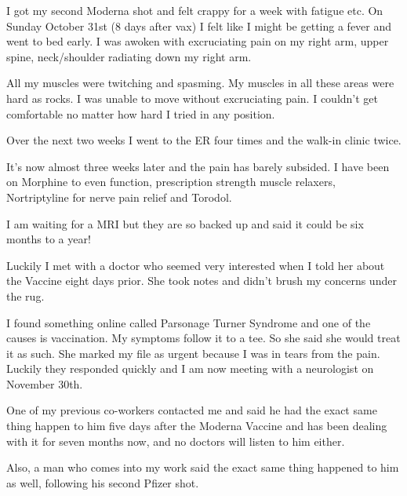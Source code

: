 I got my second Moderna shot and felt crappy for a week with fatigue etc. On
Sunday October 31st (8 days after vax) I felt like I might be getting a fever
and went to bed early. I was awoken with excruciating pain on my right arm,
upper spine, neck/shoulder radiating down my right arm.

All my muscles were twitching and spasming. My muscles in all these areas were
hard as rocks. I was unable to move without excruciating pain. I couldn’t get
comfortable no matter how hard I tried in any position.

Over the next two weeks I went to the ER four times and the walk-in clinic
twice.

It’s now almost three weeks later and the pain has barely subsided. I have been
on Morphine to even function, prescription strength muscle relaxers,
Nortriptyline for nerve pain relief and Torodol.

I am waiting for a MRI but they are so backed up and said it could be six months
to a year!

Luckily I met with a doctor who seemed very interested when I told her about the
Vaccine eight days prior. She took notes and didn’t brush my concerns under the
rug.

I found something online called Parsonage Turner Syndrome and one of the causes
is vaccination. My symptoms follow it to a tee. So she said she would treat it
as such. She marked my file as urgent because I was in tears from the
pain. Luckily they responded quickly and I am now meeting with a neurologist on
November 30th.

One of my previous co-workers contacted me and said he had the exact same thing
happen to him five days after the Moderna Vaccine and has been dealing with it
for seven months now, and no doctors will listen to him either.

Also, a man who comes into my work said the exact same thing happened to him as
well, following his second Pfizer shot.
